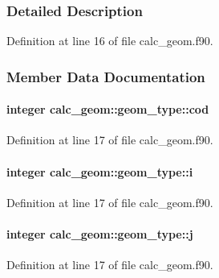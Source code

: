 \subsubsection{Detailed Description}


Definition at line 16 of file calc\-\_\-geom.\-f90.



\subsubsection{Member Data Documentation}
\hypertarget{structcalc__geom_1_1geom__type_ab28959bb210c06582b3e9edbe330c734}{
\paragraph[{cod}]{\setlength{\rightskip}{0pt plus 5cm}integer calc\-\_\-geom\-::geom\-\_\-type\-::cod}}\label{structcalc__geom_1_1geom__type_ab28959bb210c06582b3e9edbe330c734}


Definition at line 17 of file calc\-\_\-geom.\-f90.

\hypertarget{structcalc__geom_1_1geom__type_a99cb923e9c7e2e6b4d898f11d0c2a939}{
\paragraph[{i}]{\setlength{\rightskip}{0pt plus 5cm}integer calc\-\_\-geom\-::geom\-\_\-type\-::i}}\label{structcalc__geom_1_1geom__type_a99cb923e9c7e2e6b4d898f11d0c2a939}


Definition at line 17 of file calc\-\_\-geom.\-f90.

\hypertarget{structcalc__geom_1_1geom__type_a00a06ffff0b97a474c87ff18a84f4caf}{
\paragraph[{j}]{\setlength{\rightskip}{0pt plus 5cm}integer calc\-\_\-geom\-::geom\-\_\-type\-::j}}\label{structcalc__geom_1_1geom__type_a00a06ffff0b97a474c87ff18a84f4caf}


Definition at line 17 of file calc\-\_\-geom.\-f90.

